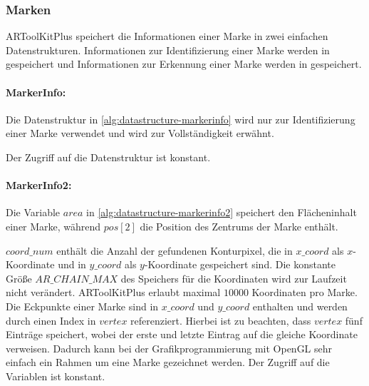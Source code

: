 \subsubsection{Marken} %
\label{sub:artoolkitplus-marken}
ARToolKitPlus speichert die Informationen einer Marke in zwei einfachen Datenstrukturen. Informationen zur
 Identifizierung einer Marke werden in  gespeichert und Informationen zur Erkennung einer Marke
 werden in  gespeichert.

\paragraph{MarkerInfo:} %
\label{par:artoolkitplus-markerinfo}
Die Datenstruktur in \autoref{alg:datastructure-markerinfo} wird nur zur Identifizierung einer Marke verwendet und wird
 zur Vollständigkeit erwähnt.

Der Zugriff auf die Datenstruktur ist konstant.

\paragraph{MarkerInfo2:} %
\label{par:artoolkitplus-markerinfo2}
Die Variable $\mathit{area}$ in \autoref{alg:datastructure-markerinfo2} speichert den Flächeninhalt einer Marke,
 während $\mathit{pos}[2]$ die Position des Zentrums der Marke enthält.

$\mathit{coord\_num}$ enthält die Anzahl der gefundenen Konturpixel, die in $\mathit{x\_coord}$ als $x$-Koordinate und
 in $\mathit{y\_coord}$ als $y$-Koordinate gespeichert sind. Die konstante Größe $\mathit{AR\_CHAIN\_MAX}$ des
 Speichers für die Koordinaten wird zur Laufzeit nicht verändert. ARToolKitPlus erlaubt maximal $10000$ Koordinaten pro
 Marke. Die Eckpunkte einer Marke sind in $\mathit{x\_coord}$ und $\mathit{y\_coord}$ enthalten und werden durch einen
 Index in $\mathit{vertex}$ referenziert. Hierbei ist zu beachten, dass $\mathit{vertex}$ fünf Einträge speichert, wobei
 der erste und letzte Eintrag auf die gleiche Koordinate verweisen. Dadurch kann bei der Grafikprogrammierung mit OpenGL
 sehr einfach ein Rahmen um eine Marke gezeichnet werden. Der Zugriff auf die Variablen  ist
 konstant.
